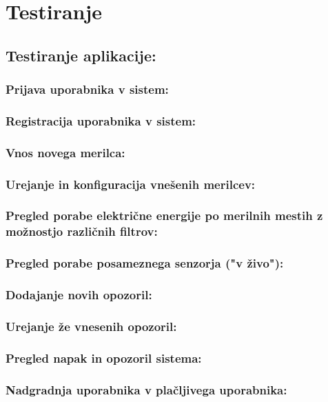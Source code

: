 \documentclass[12pt,a4paper,titlepage,openany]{report}
\begin{document}
\chapter{Testiranje}
\thispagestyle{fancy}


\section{Testiranje aplikacije:}
\thispagestyle{fancy}


\subsection{Prijava uporabnika v sistem:}
\subsection{Registracija uporabnika v sistem:}
\subsection{Vnos novega merilca:}
\subsection{Urejanje in konfiguracija vnešenih merilcev:}
\subsection{Pregled porabe električne energije po merilnih mestih z možnostjo različnih filtrov:}
\subsection{Pregled porabe posameznega senzorja ("v živo"):}
\subsection{Dodajanje novih opozoril:}
\subsection{Urejanje že vnesenih opozoril:}
\subsection{Pregled napak in opozoril sistema:}
\subsection{Nadgradnja uporabnika v plačljivega uporabnika:}
\end{document}
